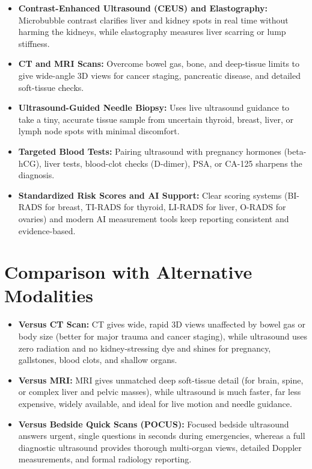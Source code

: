 \begin{itemize}
    \item \textbf{Contrast-Enhanced Ultrasound (CEUS) and Elastography:} Microbubble contrast clarifies liver and kidney spots in real time without harming the kidneys, while elastography measures liver scarring or lump stiffness.
    \item \textbf{CT and MRI Scans:} Overcome bowel gas, bone, and deep-tissue limits to give wide-angle 3D views for cancer staging, pancreatic disease, and detailed soft-tissue checks.
    \item \textbf{Ultrasound-Guided Needle Biopsy:} Uses live ultrasound guidance to take a tiny, accurate tissue sample from uncertain thyroid, breast, liver, or lymph node spots with minimal discomfort.
    \item \textbf{Targeted Blood Tests:} Pairing ultrasound with pregnancy hormones (beta-hCG), liver tests, blood-clot checks (D-dimer), PSA, or CA-125 sharpens the diagnosis.
    \item \textbf{Standardized Risk Scores and AI Support:} Clear scoring systems (BI-RADS for breast, TI-RADS for thyroid, LI-RADS for liver, O-RADS for ovaries) and modern AI measurement tools keep reporting consistent and evidence-based.
\end{itemize}

\section{Comparison with Alternative Modalities}

\begin{itemize}
    \item \textbf{Versus CT Scan:} CT gives wide, rapid 3D views unaffected by bowel gas or body size (better for major trauma and cancer staging), while ultrasound uses zero radiation and no kidney-stressing dye and shines for pregnancy, gallstones, blood clots, and shallow organs.
    \item \textbf{Versus MRI:} MRI gives unmatched deep soft-tissue detail (for brain, spine, or complex liver and pelvic masses), while ultrasound is much faster, far less expensive, widely available, and ideal for live motion and needle guidance.
    \item \textbf{Versus Bedside Quick Scans (POCUS):} Focused bedside ultrasound answers urgent, single questions in seconds during emergencies, whereas a full diagnostic ultrasound provides thorough multi-organ views, detailed Doppler measurements, and formal radiology reporting.
\end{itemize}

